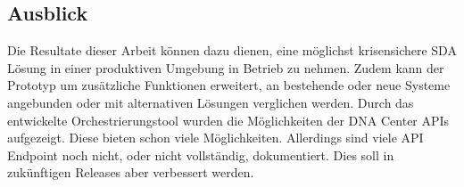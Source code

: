 \subsection{Ausblick}
Die Resultate dieser Arbeit können dazu dienen, eine möglichst krisensichere SDA Lösung in einer produktiven Umgebung in Betrieb zu nehmen. Zudem kann der Prototyp um zusätzliche Funktionen erweitert, an bestehende oder neue Systeme angebunden oder mit alternativen Lösungen verglichen werden. Durch das entwickelte Orchestrierungstool wurden die Möglichkeiten der DNA Center APIs aufgezeigt. Diese bieten schon viele Möglichkeiten. Allerdings sind viele API Endpoint noch nicht, oder nicht vollständig, dokumentiert. Dies soll in zukünftigen Releases aber verbessert werden.
